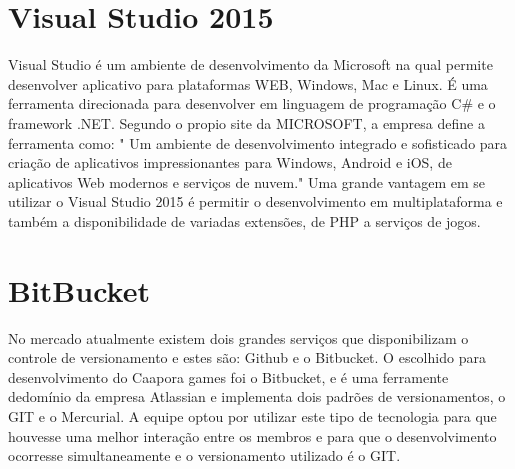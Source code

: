 	\section{Visual Studio 2015}
\label{sec:Visual Studio 2015}

Visual Studio  é um ambiente de desenvolvimento da Microsoft na qual permite desenvolver aplicativo para plataformas WEB, Windows, Mac e Linux. É uma ferramenta direcionada para desenvolver em linguagem de programação C\# e o framework .NET.
Segundo o propio site da MICROSOFT, a empresa define a ferramenta como: " Um ambiente de desenvolvimento integrado e sofisticado para criação de aplicativos impressionantes para Windows, Android e iOS, de aplicativos Web modernos e serviços de nuvem."
Uma grande vantagem em se utilizar o Visual Studio 2015 é permitir o desenvolvimento em multiplataforma e também a disponibilidade de variadas extensões, de PHP a serviços de jogos.

\section{BitBucket}
\label{sec:BitBucket}

No mercado atualmente existem dois grandes serviços que disponibilizam o controle de versionamento e estes são: Github e o Bitbucket. O escolhido para desenvolvimento do Caapora games foi o Bitbucket, e é uma ferramente dedomínio da empresa Atlassian e implementa dois padrões de versionamentos, o GIT e o Mercurial.
 A equipe optou por utilizar este tipo de tecnologia para que houvesse uma melhor interação entre os membros e para que o desenvolvimento ocorresse simultaneamente e o versionamento utilizado é o GIT.

	
	\begin{quadro}[h!]	
		\centering
	\end{quadro}
	

